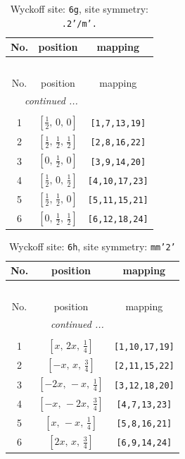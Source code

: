 \documentclass[fleqn,8pt]{jsarticle}
\begin{document}
\renewcommand{\arraystretch}{1.2}
\begin{longtable}{ccc}
\caption{Wyckoff site: {\tt 6g}, site symmetry: {\tt .2'/m'.}}
 \\
 \hline \hline
No. & position & mapping \\ \hline \endfirsthead

\multicolumn{2}{l}{\tablename\ \thetable{}} \\
 \hline \hline
No. & position & mapping \\ \hline \endhead

 \hline \hline
\multicolumn{2}{r}{\footnotesize\it continued ...} \\ \endfoot

 \hline \hline
\multicolumn{2}{r}{} \\ \endlastfoot

1 & $\left[ \frac{1}{2},\, 0,\, 0 \right]$ & {\tt [1,7,13,19]} \\ \hline
2 & $\left[ \frac{1}{2},\, \frac{1}{2},\, \frac{1}{2} \right]$ & {\tt [2,8,16,22]} \\ \hline
3 & $\left[ 0,\, \frac{1}{2},\, 0 \right]$ & {\tt [3,9,14,20]} \\ \hline
4 & $\left[ \frac{1}{2},\, 0,\, \frac{1}{2} \right]$ & {\tt [4,10,17,23]} \\ \hline
5 & $\left[ \frac{1}{2},\, \frac{1}{2},\, 0 \right]$ & {\tt [5,11,15,21]} \\ \hline
6 & $\left[ 0,\, \frac{1}{2},\, \frac{1}{2} \right]$ & {\tt [6,12,18,24]} \\
\end{longtable}
\renewcommand{\arraystretch}{1.2}
\begin{longtable}{ccc}
\caption{Wyckoff site: {\tt 6h}, site symmetry: {\tt mm'2'}}
 \\
 \hline \hline
No. & position & mapping \\ \hline \endfirsthead

\multicolumn{2}{l}{\tablename\ \thetable{}} \\
 \hline \hline
No. & position & mapping \\ \hline \endhead

 \hline \hline
\multicolumn{2}{r}{\footnotesize\it continued ...} \\ \endfoot

 \hline \hline
\multicolumn{2}{r}{} \\ \endlastfoot

1 & $\left[ x,\, 2 x,\, \frac{1}{4} \right]$ & {\tt [1,10,17,19]} \\ \hline
2 & $\left[ - x,\, x,\, \frac{3}{4} \right]$ & {\tt [2,11,15,22]} \\ \hline
3 & $\left[ - 2 x,\, - x,\, \frac{1}{4} \right]$ & {\tt [3,12,18,20]} \\ \hline
4 & $\left[ - x,\, - 2 x,\, \frac{3}{4} \right]$ & {\tt [4,7,13,23]} \\ \hline
5 & $\left[ x,\, - x,\, \frac{1}{4} \right]$ & {\tt [5,8,16,21]} \\ \hline
6 & $\left[ 2 x,\, x,\, \frac{3}{4} \right]$ & {\tt [6,9,14,24]} \\
\end{longtable}
\end{document}
